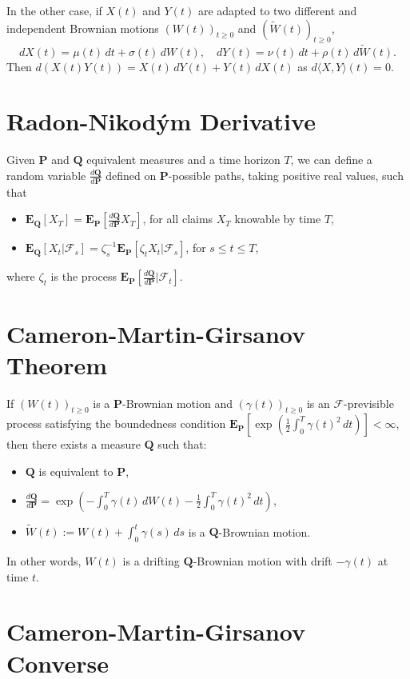 \documentclass[twocolumn]{amsart}
\renewcommand{\P}{\mathbf{P}}
\newcommand{\Q}{\mathbf{Q}}
\newcommand{\EP}{\mathbf{E}_\mathbf{P}}
\newcommand{\EQ}{\mathbf{E}_\mathbf{Q}}
\newcommand{\F}{\mathcal{F}}
\newcommand{\QV}[1]{\langle#1\rangle}
\newcommand{\tW}{\widetilde W}
\begin{document}
In the other case, if $X(t)$ and $Y(t)$ are adapted to two different and independent Brownian motions $(W(t))_{t \ge 0} $ and $(\tW(t))_{t \ge 0}$,
\[
    dX(t) =  \mu(t)\,dt + \sigma(t) \,dW(t), \quad
    dY(t) =  \nu(t)\,dt + \rho(t)\,d\tW(t).
\]
Then $d(X(t) Y(t)) = X(t) \,dY(t) + Y(t)\,dX(t)$ as $d\QV{X,Y}(t) = 0$.

\section*{Radon-Nikod\'ym Derivative}

Given $\P$ and $\Q$ equivalent measures and a time horizon $T$, we can define a random variable $\frac{d\Q}{d\P}$ defined on $\P$-possible paths, taking positive real values, such that
\begin{itemize}
    \item $\displaystyle \EQ[X_T] = \EP\left[\frac{d\Q}{d\P} X_T \right]$, for all claims $X_T$ knowable by time $T$,
    \item $\displaystyle \EQ[X_t | \F_s] = \zeta_s^{-1} \EP\left[\zeta_t X_t|\F_s\right]$, for $s \le t \le T$,
\end{itemize}
where $\zeta_t$ is the process $\EP[\frac{d \Q}{d \P} | \F_t]$.

\section*{Cameron-Martin-Girsanov Theorem}

If $(W(t))_{t \ge 0}$ is a $\P$-Brownian motion and $(\gamma(t))_{t \ge 0}$ is an $\F$-previsible process satisfying the boundedness condition $\EP\left[\exp\left(\frac{1}{2} \int_0^T\gamma(t)^2\,dt\right)\right] < \infty$, then there exists a measure $\Q$ such that:
\begin{itemize}
    \item $\Q$ is equivalent to $\P$,
    \item $\displaystyle \frac{d \Q}{d \P} = \exp\left(- \int_0^T \gamma(t)\,dW(t) - \frac{1}{2} \int_0^T \gamma(t)^2\,dt \right)$,
    \item $\tW(t) := W(t) + \int_0^t \gamma(s)\,ds$ is a $\Q$-Brownian motion.
\end{itemize}
In other words, $W(t)$ is a drifting $\Q$-Brownian motion with drift $-\gamma(t)$ at time $t$.

\section*{Cameron-Martin-Girsanov Converse}
\end{document}
